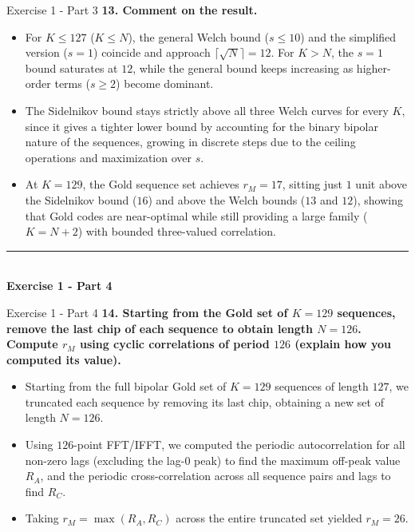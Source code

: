 \documentclass[10pt, aspectratio=169]{beamer}
\newcommand{\question}[1]{{\color{QuestionRed}\textbf{#1}}}
\begin{document}
	\begin{frame}{Exercise 1 - Part 3}
		\question{13. Comment on the result.}
		
		\vspace{0.1cm}
		\begin{itemize}
			\item For $K \le 127$ ($K \le N$), the general Welch bound ($s \le 10$) and the simplified version ($s = 1$) coincide and approach $\lceil\sqrt{N}\rceil = 12$. For $K > N$, the $s = 1$ bound saturates at $12$, while the general bound keeps increasing as higher-order terms ($s \ge 2$) become dominant.
			\item The Sidelnikov bound stays strictly above all three Welch curves for every $K$, since it gives a tighter lower bound by accounting for the binary bipolar nature of the sequences, growing in discrete steps due to the ceiling operations and maximization over $s$.
			\item At $K = 129$, the Gold sequence set achieves $r_M = 17$, sitting just $1$ unit above the Sidelnikov bound ($16$) and above the Welch bounds ($13$ and $12$), showing that Gold codes are near-optimal while still providing a large family ($K = N + 2$) with bounded three-valued correlation.
		\end{itemize}
		
	\end{frame}
	
	\begin{frame}[plain]
		\vfill
		\centering
		{\color{TealAccent}\rule{2cm}{2pt}}\\[0.4cm]
		{\LARGE\bfseries\color{NavyPrimary} Exercise 1 - Part 4}\\[0.2cm]
		\vfill
	\end{frame}
	
	\begin{frame}{Exercise 1 - Part 4}
		\question{14. Starting from the Gold set of $K = 129$ sequences, remove the last chip of each sequence to obtain length $N = 126$. Compute $r_M$ using cyclic correlations of period $126$ (explain how you computed its value).}
		
		\vspace{0.1cm}
		\begin{itemize}
			\item Starting from the full bipolar Gold set of $K = 129$ sequences of length $127$, we truncated each sequence by removing its last chip, obtaining a new set of length $N = 126$.
			\item Using $126$-point FFT/IFFT, we computed the periodic autocorrelation for all non-zero lags (excluding the lag-$0$ peak) to find the maximum off-peak value $R_A$, and the periodic cross-correlation across all sequence pairs and lags to find $R_C$.
			\item Taking $r_M = \max(R_A, R_C)$ across the entire truncated set yielded $r_M = 26$.
		\end{itemize}
		
	\end{frame}
	
\end{document}
